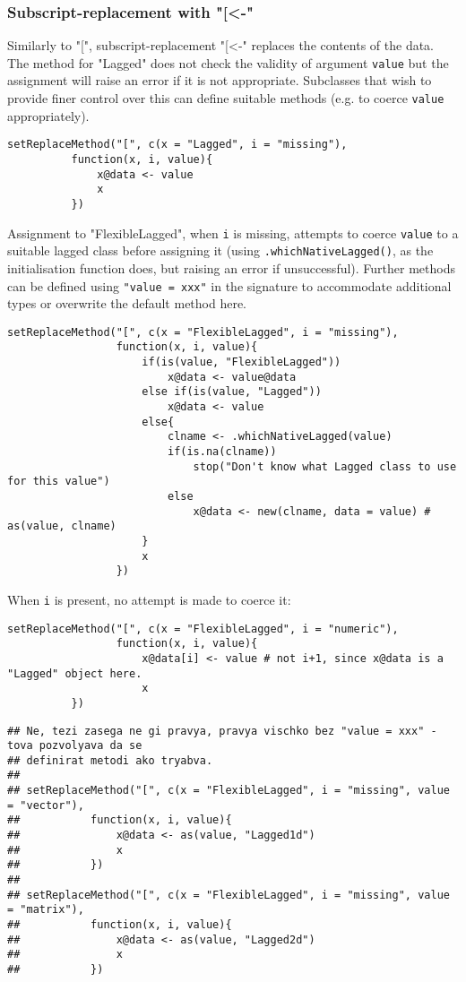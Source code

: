 \documentclass[11pt,a4paper]{article}
\begin{document}
\subsubsection{Subscript-replacement with "[<-"}
\label{sec:orgaba311f}

Similarly to "[", subscript-replacement "[<-" replaces the contents of the data.  The method
for "Lagged" does not check the validity of argument \texttt{value} but the assignment will
raise an error if it is not appropriate. Subclasses that wish to provide finer control over
this can define suitable methods (e.g. to coerce \texttt{value} appropriately).
\begin{verbatim}
setReplaceMethod("[", c(x = "Lagged", i = "missing"),
          function(x, i, value){
              x@data <- value
              x
          })
\end{verbatim}

Assignment to "FlexibleLagged", when \texttt{i} is missing, attempts to coerce \texttt{value} to a suitable
lagged class before assigning it (using \texttt{.whichNativeLagged()}, as the initialisation
function does, but raising an error if unsuccessful). Further methods can be defined using
\texttt{"value = xxx"} in the signature to accommodate additional types or overwrite the default
method here.
\begin{verbatim}
setReplaceMethod("[", c(x = "FlexibleLagged", i = "missing"),
                 function(x, i, value){
                     if(is(value, "FlexibleLagged"))
                         x@data <- value@data
                     else if(is(value, "Lagged"))
                         x@data <- value
                     else{
                         clname <- .whichNativeLagged(value)
                         if(is.na(clname))
                             stop("Don't know what Lagged class to use for this value")
                         else
                             x@data <- new(clname, data = value) # as(value, clname)
                     }
                     x
                 })
\end{verbatim}
When \texttt{i} is present, no attempt is made to coerce it:
\begin{verbatim}
setReplaceMethod("[", c(x = "FlexibleLagged", i = "numeric"),
                 function(x, i, value){
                     x@data[i] <- value # not i+1, since x@data is a "Lagged" object here.
                     x
          })
\end{verbatim}

\begin{verbatim}
## Ne, tezi zasega ne gi pravya, pravya vischko bez "value = xxx" - tova pozvolyava da se
## definirat metodi ako tryabva.
##
## setReplaceMethod("[", c(x = "FlexibleLagged", i = "missing", value = "vector"),
##           function(x, i, value){
##               x@data <- as(value, "Lagged1d")
##               x
##           })
##
## setReplaceMethod("[", c(x = "FlexibleLagged", i = "missing", value = "matrix"),
##           function(x, i, value){
##               x@data <- as(value, "Lagged2d")
##               x
##           })
\end{verbatim}
\end{document}
